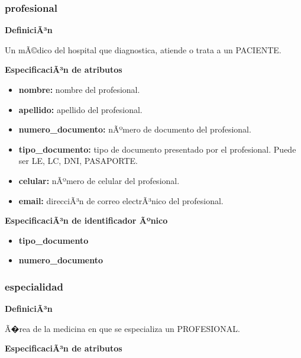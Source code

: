 \documentclass[a4paper,11pt]{article}
\begin{document}
\subsubsection{\textbf{profesional}}

\textbf{DefiniciÃ³n}

Un mÃ©dico del hospital que diagnostica, atiende o trata a un PACIENTE.

\textbf{EspecificaciÃ³n de atributos}

\begin{itemize}

     \item \textbf{nombre:} nombre del profesional.

     \item \textbf{apellido:} apellido del profesional.

     \item \textbf{numero\_documento:} nÃºmero de documento del profesional.

     \item \textbf{tipo\_documento:} tipo de documento presentado por el profesional. Puede ser 
     LE, LC, DNI, PASAPORTE.

     \item \textbf{celular:} nÃºmero de celular del profesional.

     \item \textbf{email:} direcciÃ³n de correo electrÃ³nico del profesional.

\end{itemize}

\textbf{EspecificaciÃ³n de identificador Ãºnico}

\begin{itemize}

     \item \textbf{tipo\_documento}

     \item \textbf{numero\_documento}

\end{itemize}

\subsubsection{\textbf{especialidad}}

\textbf{DefiniciÃ³n}

Ã�rea de la medicina en que se especializa un PROFESIONAL.

\textbf{EspecificaciÃ³n de atributos}
\end{document}
